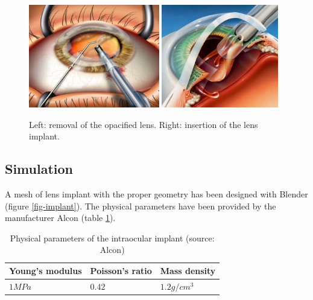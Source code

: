 \documentclass{llncs}
\begin{document}
\begin{figure}[h]
\begin{center}
\includegraphics[height=4.5cm]{images/suction}
\hspace{0.2cm}
\includegraphics[height=4.5cm]{images/deployment}
\caption [Cataract surgery] {Left: removal of the opacified lens. Right: insertion of the lens implant.}
\label{fig-surgery}
\end{center}
\end{figure}



\subsection{Simulation}

A mesh of lens implant with the proper geometry has been designed with Blender (figure \ref{fig-implant}). The physical parameters have been provided by the manufacturer Alcon (table \ref{tab-parameters}). 

\begin{table}[h!]
	\begin{center}
		\begin{tabular}{|p{3cm}|p{3cm}|p{3cm}|}
		\hline
		 \centering Young's modulus & \centering Poisson's ratio & \centering Mass density \tabularnewline
		\hline
		\centering $1 MPa$ & \centering $0.42$ & \centering $1.2 g/cm^3$ \tabularnewline
		\hline
		\end{tabular}
	\vspace{0.3cm}
	\caption{Physical parameters of the intraocular implant (source: Alcon)}
	\label{tab-parameters}
	\end{center}
\end{table}
\end{document}
